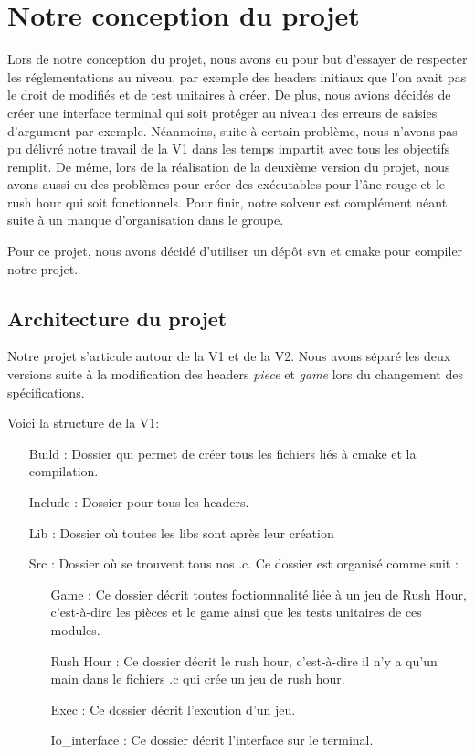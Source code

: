 \documentclass{report}
\begin{document}
\chapter{Notre conception du projet}
\setcounter{section}{0}
Lors de notre conception du projet, nous avons eu pour but d'essayer de respecter les réglementations au niveau, par exemple des headers initiaux que l'on avait pas le droit de modifiés et de test unitaires  à créer. De plus, nous avions décidés de créer une interface terminal qui soit protéger au niveau des erreurs de saisies d'argument par exemple. Néanmoins, suite à certain problème, nous n'avons pas pu délivré notre travail de la V1 dans les temps impartit avec tous les objectifs remplit. De même, lors de la réalisation de la deuxième version du projet, nous avons aussi eu des problèmes pour créer des exécutables pour l'âne rouge et le rush hour qui soit fonctionnels. Pour finir, notre solveur est complément néant suite à un manque d'organisation dans le groupe.

Pour ce projet, nous avons décidé d'utiliser un dépôt svn et cmake pour compiler notre projet.
\section{Architecture du projet}
Notre projet s'articule autour de la V1 et de la V2. Nous avons séparé les deux versions suite à la modification des headers \textit{piece} et \textit{game} lors du changement des spécifications.

Voici la structure de la V1:

\begin{itemize}
\item[Build :]Dossier qui permet de créer tous les fichiers liés à cmake et la compilation.
\item[Include :]Dossier pour tous les headers.
\item[Lib :]Dossier où toutes les libs sont après leur création
\item[Src :]Dossier où se trouvent tous nos .c. Ce dossier est organisé comme suit :
  \begin{itemize}
  \item[Game :]Ce dossier décrit toutes foctionnnalité liée à un jeu de Rush Hour, c'est-à-dire les pièces et le game ainsi que les tests unitaires de ces modules.
  \item[Rush Hour :]Ce dossier décrit le rush hour, c'est-à-dire il n'y a qu'un main dans le fichiers .c qui crée un jeu de rush hour. 
  \item[Exec :]Ce dossier décrit l'excution d'un jeu.
  \item[Io\_interface :]Ce dossier décrit l'interface sur le terminal.
  \end{itemize}
\end{itemize}
\end{document}

